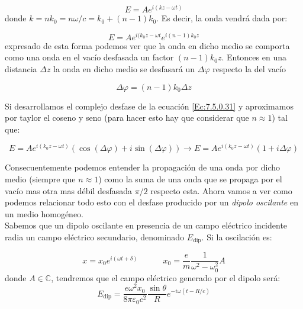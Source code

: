 \documentclass[12pt]{article}
\newcommand{\tquad}{\quad \quad \quad}
\numberwithin{equation}{section}
\numberwithin{figure}{section}
\begin{document}
\begin{equation}
E = A e^{i (kz-\omega t)}
\end{equation}
donde $k = n k_0 = n \omega/c = k_0 + (n-1) k_0$. Es decir, la onda vendrá dada por:

\begin{equation}
E = A e^{i (k_0z-\omega t} e^{i (n-1)k_0 z} \label{Ec:7.5.0.31}
\end{equation}
expresado de esta forma podemos ver que la onda en dicho medio se comporta como una onda en el vacío desfasada un factor $(n-1)k_0 z$. Entonces en una distancia $\Delta z$ la onda en dicho medio se desfasará un $\Delta \varphi$ respecto la del vacío 

\begin{equation}
\Delta \varphi = (n-1)k_0 \Delta z
\end{equation}

Si desarrollamos el complejo desfase de la ecuación \ref{Ec:7.5.0.31} y aproximamos por taylor el coseno y seno (para hacer esto hay que considerar que $n \approx 1$) tal que:

\begin{equation}
E=A e^{i (k_0z-\omega t)}  ( \cos (\Delta \varphi) + i  \sin (\Delta \varphi) ) \longrightarrow E = A e^{i (k_0z-\omega t)}  (	1+ i\Delta \varphi )
\end{equation}

Consecuentemente podemos entender la propagación de una onda por dicho medio (siempre que $n \approx 1$) como la suma de una onda que se propaga por el vacío mas 
otra mas débil desfasada $\pi/2$ respecto esta. Ahora vamos a ver como podemos relacionar todo esto con el desfase producido por un \textit{dipolo oscilante} en un medio homogéneo. \\

Sabemos que un dipolo oscilante en presencia de un campo eléctrico incidente radia un campo eléctrico secundario, denominado $E_{\mathrm{dip}}$. Si la oscilación es:

\begin{equation}
x = x_0 e^{i (\omega t + \delta)} \tquad x_0 = \dfrac{e}{m} \dfrac{1}{\omega^2-\omega_0^2} A
\end{equation}
donde $A \in \mathbb{C}$, tendremos que el campo eléctrico generado por el dipolo será:
\begin{equation}
E_{\mathrm{dip}} = \dfrac{e \omega^2 x_0}{8 \pi \varepsilon_0 c^2} \dfrac{\sin \theta}{R} e^{-i \omega (t - R/c)}
\end{equation}
\end{document}
